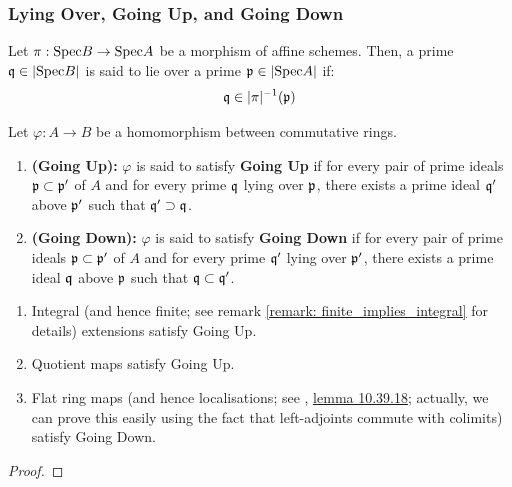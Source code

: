         \subsubsection{Lying Over, Going Up, and Going Down}
            \begin{definition}
                Let $\pi: \mathrm{Spec} B \to \mathrm{Spec} A$ be a morphism of affine schemes. Then, a prime $\mathfrak{q} \in |\mathrm{Spec} B|$ is said to lie over a prime $\mathfrak{p} \in |\mathrm{Spec} A|$ if:
                    $$\mathfrak{q} \in |\pi|^{-1}(\mathfrak{p})$$
            \end{definition}
        
            \begin{definition}
                Let $\varphi: A \to B$ be a homomorphism between commutative rings.
                    \begin{enumerate}
                        \item \textbf{(Going Up):} $\varphi$ is said to satisfy \textbf{Going Up} if for every pair of prime ideals $\mathfrak{p} \subset \mathfrak{p}'$ of $A$ and for every prime $\mathfrak{q}$ lying over $\mathfrak{p}$, there exists a prime ideal $\mathfrak{q}'$ above $\mathfrak{p}'$ such that $\mathfrak{q}' \supset \mathfrak{q}$.  
                        \item \textbf{(Going Down):} $\varphi$ is said to satisfy \textbf{Going Down} if for every pair of prime ideals $\mathfrak{p} \subset \mathfrak{p}'$ of $A$ and for every prime $\mathfrak{q}'$ lying over $\mathfrak{p}'$, there exists a prime ideal $\mathfrak{q}$ above $\mathfrak{p}$ such that $\mathfrak{q} \subset \mathfrak{q}'$. 
                    \end{enumerate}
            \end{definition}
            
            \begin{proposition} \label{prop: going_up_and_down_criteria}
                \noindent
                \begin{enumerate}
                    \item Integral (and hence finite; see remark \ref{remark: finite_implies_integral} for details) extensions satisfy Going Up.
                    \item Quotient maps satisfy Going Up.
                    \item Flat ring maps (and hence localisations; see \cite{stacks}, \href{https://stacks.math.columbia.edu/tag/00HT}{\underline{lemma 10.39.18}}; actually, we can prove this easily using the fact that left-adjoints commute with colimits) satisfy Going Down. 
                \end{enumerate}
            \end{proposition}
                \begin{proof}
                     
                \end{proof}
            
